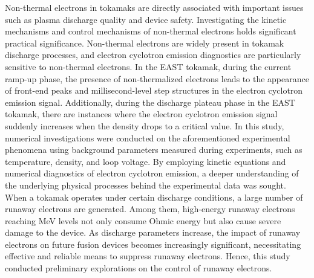\begin{abstract*}
\par
Non-thermal electrons in tokamaks are directly associated with important issues such as plasma discharge quality and device safety. Investigating the kinetic mechanisms and control mechanisms of non-thermal electrons holds significant practical significance. Non-thermal electrons are widely present in tokamak discharge processes, and electron cyclotron emission diagnostics are particularly sensitive to non-thermal electrons. In the EAST tokamak, during the current ramp-up phase, the presence of non-thermalized electrons leads to the appearance of front-end peaks and millisecond-level step structures in the electron cyclotron emission signal. Additionally, during the discharge plateau phase in the EAST tokamak, there are instances where the electron cyclotron emission signal suddenly increases when the density drops to a critical value.
In this study, numerical investigations were conducted on the aforementioned experimental phenomena using background parameters measured during experiments, such as temperature, density, and loop voltage. By employing kinetic equations and numerical diagnostics of electron cyclotron emission, a deeper understanding of the underlying physical processes behind the experimental data was sought. When a tokamak operates under certain discharge conditions, a large number of runaway electrons are generated. Among them, high-energy runaway electrons reaching MeV levels not only consume Ohmic energy but also cause severe damage to the device. As discharge parameters increase, the impact of runaway electrons on future fusion devices becomes increasingly significant, necessitating effective and reliable means to suppress runaway electrons. Hence, this study conducted preliminary explorations on the control of runaway electrons.
\par

\end{abstract*}
